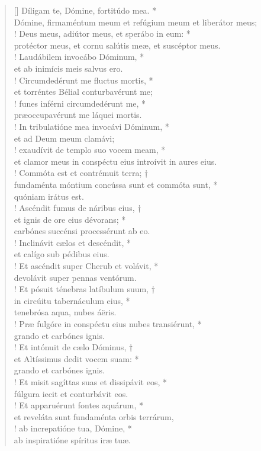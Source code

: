 \begin{verse}[\versewidth]
Díligam te, Dómine, fortitúdo mea. *\\
Dómine, firmaméntum meum \verselinebreak et refúgium meum et liberátor meus;\\!
\vin Deus meus, adiútor meus, et sperábo in eum: *\\
\vin protéctor meus, et cornu salútis meæ, et suscéptor meus.\\!
Laudábilem invocábo Dóminum, *\\
et ab inimícis meis salvus ero.\\!
\vin Circumdedérunt me fluctus mortis, *\\
\vin et torréntes Bélial conturbavérunt me;\\!
funes inférni circumdedérunt me, *\\
præoccupavérunt me láquei mortis.\\!
\vin In tribulatióne mea invocávi Dóminum, *\\
\vin et ad Deum meum clamávi;\\!
exaudívit de templo suo vocem meam, *\\
et clamor meus in conspéctu eius introívit in aures eius.\\!
\vin Commóta est et contrémuit terra; †\\
\vin fundaménta móntium concússa sunt et commóta sunt, *\\
\vin quóniam irátus est.\\!
Ascéndit fumus de náribus eius, †\\
et ignis de ore eius dévorans; *\\
carbónes succénsi processérunt ab eo.\\!
\vin Inclinávit cælos et descéndit, *\\
\vin et calígo sub pédibus eius.\\!
Et ascéndit super Cherub et volávit, *\\
devolávit super pennas ventórum.\\!
\vin Et pósuit ténebras latíbulum suum, †\\
\vin in circúitu tabernáculum eius, *\\
\vin tenebrósa aqua, nubes áëris.\\!
Præ fulgóre in conspéctu eius nubes transiérunt, *\\
grando et carbónes ignis.\\!
\vin Et intónuit de cælo Dóminus, †\\
\vin et Altíssimus dedit vocem suam: *\\
\vin grando et carbónes ignis.\\!
Et misit sagíttas suas et dissipávit eos, *\\
fúlgura iecit et conturbávit eos.\\!
\vin Et apparuérunt fontes aquárum, *\\
\vin et reveláta sunt fundaménta orbis terrárum,\\!
ab increpatióne tua, Dómine, *\\
ab inspiratióne spíritus iræ tuæ.\\
\end{verse}

